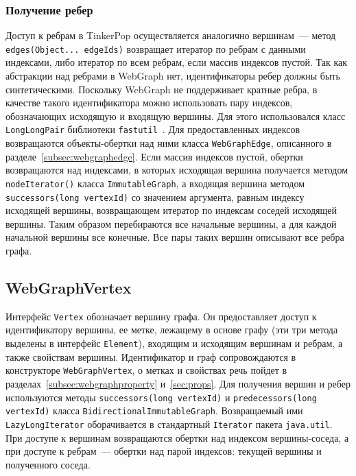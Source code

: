 \documentclass[times,specification,annotation]{itmo-student-thesis}
\begin{document}
\subsubsection{Получение ребер}

Доступ к ребрам в TinkerPop осуществляется аналогично вершинам~--- метод \texttt{edges(Object... edgeIds)} возвращает итератор по ребрам с данными индексами, либо итератор по всем ребрам, если массив индексов пустой.
Так как абстракции над ребрами в WebGraph нет, идентификаторы ребер должны быть синтетическими. Поскольку WebGraph не поддерживает кратные ребра, в качестве такого идентификатора можно использовать пару индексов, обозначающих исходящую и входящую вершины. Для этого использовался класс \texttt{LongLongPair} библиотеки \texttt{fastutil}~\cite{fastutil}.
Для предоставленных индексов возвращаются объекты-обертки над ними класса \texttt{WebGraphEdge}, описанного в разделе~\ref{subsec:webgraphedge}.
Если массив индексов пустой, обертки возвращаются над индексами, в которых исходящая вершина получается методом \texttt{nodeIterator()} класса \texttt{ImmutableGraph}, а входящая вершина методом \texttt{successors(long vertexId)} со значением аргумента, равным индексу исходящей вершины, возвращающем итератор по индексам соседей исходящей вершины. Таким образом перебираются все начальные вершины, а для каждой начальной вершины все конечные. Все пары таких вершин описывают все ребра графа.

\subsection{WebGraphVertex}\label{subsec:webgraphvertex}

Интерфейс \texttt{Vertex} обозначает вершину графа. Он предоставляет доступ к идентификатору вершины, ее метке, лежащему в основе графу (эти три метода выделены в интерфейс \texttt{Element}), входящим и исходящим вершинам и ребрам, а также свойствам вершины.
Идентификатор и граф сопровождаются в конструкторе \texttt{WebGraphVertex}, о метках и свойствах речь пойдет в разделах~\ref{subsec:webgraphproperty} и~\ref{sec:props}.
Для получения вершин и ребер используются методы \texttt{successors(long vertexId)} и \texttt{predecessors(long vertexId)} класса \texttt{BidirectionalImmutableGraph}. Возвращаемый ими \texttt{LazyLongIterator} оборачивается в стандартный \texttt{Iterator} пакета \texttt{java.util}. При доступе к вершинам возвращаются обертки над индексом вершины-соседа, а при доступе к ребрам~--- обертки над парой индексов: текущей вершины и полученного соседа.
\end{document}
